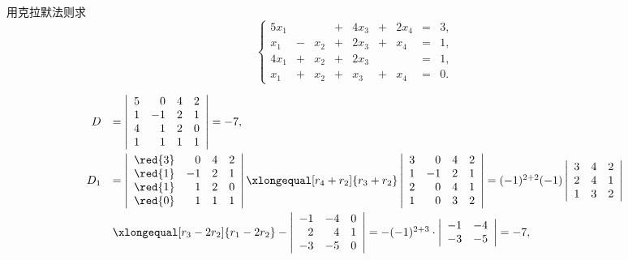 \begin{li}
  用克拉默法则求
  $$
  \left\{
    \begin{array}{rcrcrcrcrc}
      5x_1&&&+&4x_3&+&2x_4&=&3,\\[0.1cm]
      x_1&-&x_2&+&2x_3&+& x_4&=&1,\\[0.1cm]
      4x_1&+&x_2&+&2x_3& & &=&1,\\[0.1cm]
      x_1&+&x_2&+& x_3&+&x_4&=&0.
    \end{array}
  \right.
  $$
\end{li}

\begin{jie}
$$
\begin{array}{rl}
  D & = \left|
      \begin{array}{rrrr}
        5&0&4&2\\
        1&-1&2&1\\
        4&1&2&0\\
        1&1&1&1
      \end{array}
               \right| = -7, \\[0.3in]  
  D_1 & = \left|
        \begin{array}{rrrr}
          \red{3}&0&4&2\\
          \red{1}&-1&2&1\\
          \red{1}&1&2&0\\
          \red{0}&1&1&1
        \end{array}
                       \right| \xlongequal[r_4+r_2]{r_3+r_2} \left|
                       \begin{array}{rrrr}
                         3&0&4&2\\
                         1&-1&2&1\\
                         2&0&4&1\\
                         1&0&3&2
                       \end{array}
                                \right| =  (-1)^{2+2} (-1) \left|
                                \begin{array}{rrrr}
                                  3&4&2\\
                                  2&4&1\\
                                  1&3&2
                                \end{array}
                                       \right| \\[0.3in]
    & \xlongequal[r_3-2r_2]{r_1-2r_2}  - \left|
      \begin{array}{rrrr}
        -1&-4&0\\
        2&4&1\\
        -3&-5&0
      \end{array}
               \right|  = - (-1)^{2+3} \cdot  \left|
               \begin{array}{rrrr}
                 -1&-4\\
                 -3&-5
               \end{array}
                     \right| = -7,
\end{array}
$$






\end{jie}
